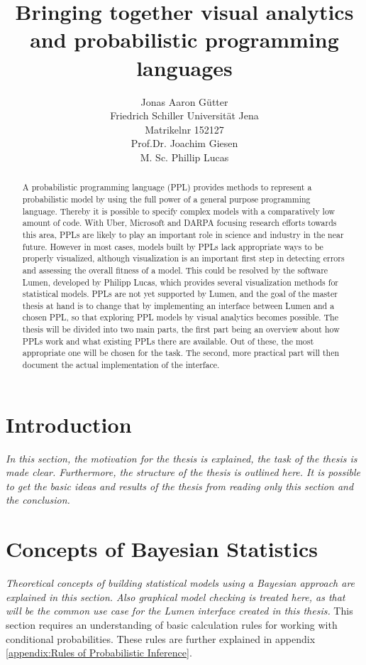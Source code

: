 \documentclass{article}
\title{Bringing together visual analytics and probabilistic programming languages}
\author{Jonas Aaron Gütter  \\
	Friedrich Schiller Universität Jena  \\
    Matrikelnr 152127 \\
    Prof.Dr. Joachim Giesen \\
    M. Sc. Phillip Lucas
	}
\begin{document}
\maketitle

\begin{abstract}
A probabilistic programming language (PPL) provides methods to represent a probabilistic model by using the full power of a general purpose programming language. Thereby it is possible to specify complex models with a comparatively low amount of code. With Uber, Microsoft and DARPA focusing research efforts towards this area, PPLs are likely to play an important role in science and industry in the near future.
However in most cases, models built by PPLs lack appropriate ways to be properly visualized, although visualization is an important first step in detecting errors and assessing the overall fitness of a model. This could be resolved by the software Lumen, developed by Philipp Lucas, which provides several visualization methods for statistical models. PPLs are not yet supported by Lumen, and the goal of the master thesis at hand is to change that by implementing an interface between Lumen and a chosen PPL, so that exploring PPL models by visual analytics becomes possible.
The thesis will be divided into two main parts, the first part being an overview about how PPLs work and what existing PPLs there are available. Out of these, the most appropriate one will be chosen for the task. The second, more practical part will then document the actual implementation of the interface.

\end{abstract}

\tableofcontents


\printglossaries
\section{Introduction}

\textit{In this section, the motivation for the thesis is explained, the task of the thesis is made clear. Furthermore, the structure of the thesis is outlined here. It is possible to get the basic ideas and results of the thesis from reading only this section and the conclusion.}

\section{Concepts of Bayesian Statistics}

\textit{Theoretical concepts of building statistical models using a Bayesian approach are explained in this section. Also graphical model checking is treated here, as that will be the common use case for the Lumen interface created in this thesis.} 
This section requires an understanding of basic calculation rules for working with conditional probabilities. These rules are further explained in appendix \ref{appendix:Rules of Probabilistic Inference}.
\end{document}
